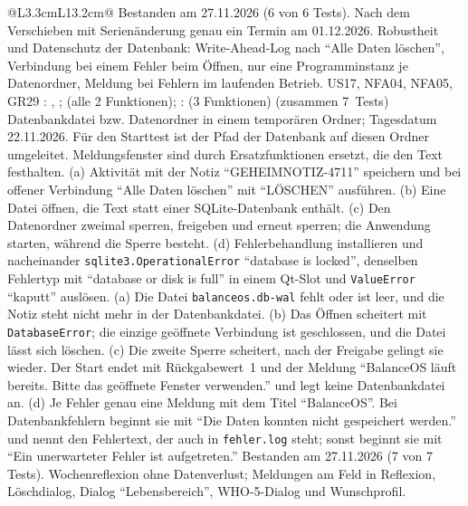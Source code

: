\begin{longtable}{@{}L{3.3cm}L{13.2cm}@{}}
    {Bestanden am 27.11.2026 (6 von 6 Tests). Nach dem Verschieben mit Serienänderung genau ein Termin am 01.12.2026.}
  \midrule
    {Robustheit und Datenschutz der Datenbank: Write-Ahead-Log nach \enquote{Alle Daten löschen}, Verbindung bei einem Fehler beim Öffnen, nur eine Programminstanz je Datenordner, Meldung bei Fehlern im laufenden Betrieb.}
    {US17, NFA04, NFA05, GR29}
    {: , ;  (alle 2 Funktionen); :  (3 Funktionen) (zusammen 7~Tests)}
    {Datenbankdatei bzw. Datenordner in einem temporären Ordner; Tagesdatum 22.11.2026. Für den Starttest ist der Pfad der Datenbank auf diesen Ordner umgeleitet. Meldungsfenster sind durch Ersatzfunktionen ersetzt, die den Text festhalten.}
    {(a) Aktivität mit der Notiz \enquote{GEHEIMNOTIZ-4711} speichern und bei offener Verbindung \enquote{Alle Daten löschen} mit \enquote{LÖSCHEN} ausführen. (b) Eine Datei öffnen, die Text statt einer SQLite-Datenbank enthält. (c) Den Datenordner zweimal sperren, freigeben und erneut sperren; die Anwendung starten, während die Sperre besteht. (d) Fehlerbehandlung installieren und nacheinander \texttt{sqlite3.OperationalError} \enquote{database is locked}, denselben Fehlertyp mit \enquote{database or disk is full} in einem Qt-Slot und \texttt{ValueError} \enquote{kaputt} auslösen.}
    {(a) Die Datei \texttt{balanceos.db-wal} fehlt oder ist leer, und die Notiz steht nicht mehr in der Datenbankdatei. (b) Das Öffnen scheitert mit \texttt{DatabaseError}; die einzige geöffnete Verbindung ist geschlossen, und die Datei lässt sich löschen. (c) Die zweite Sperre scheitert, nach der Freigabe gelingt sie wieder. Der Start endet mit Rückgabewert~1 und der Meldung \enquote{BalanceOS läuft bereits. Bitte das geöffnete Fenster verwenden.} und legt keine Datenbankdatei an. (d) Je Fehler genau eine Meldung mit dem Titel \enquote{BalanceOS}. Bei Datenbankfehlern beginnt sie mit \enquote{Die Daten konnten nicht gespeichert werden.} und nennt den Fehlertext, der auch in \texttt{fehler.log} steht; sonst beginnt sie mit \enquote{Ein unerwarteter Fehler ist aufgetreten.}}
    {Bestanden am 27.11.2026 (7 von 7 Tests).}
  \midrule
    {Wochenreflexion ohne Datenverlust; Meldungen am Feld in Reflexion, Löschdialog, Dialog \enquote{Lebensbereich}, WHO-5-Dialog und Wunschprofil.}

\end{longtable}
